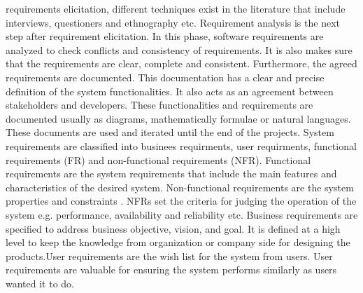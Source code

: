 requirements elicitation, different techniques exist in the literature that
include interviews, questioners and ethnography etc.
Requirement analysis \cite{Nuseibeh:2000} is the next step
after requirement elicitation. In this phase, software requirements are analyzed
to check conflicts and consistency of requirements. It is also makes sure that
the requirements are clear, complete and consistent. Furthermore, the agreed
requirements are documented. This documentation has a clear and precise
definition of the system functionalities. It also acts as an agreement between
stakeholders and developers. These functionalities and requirements are
documented usually as diagrams, mathematically formulae or natural languages.
These documents are used and iterated until the end of the projects.
System requirements are classified into businees requirments, user requirments,
functional requirements (FR) and non-functional requirements (NFR). Functional
requirements are the system requirements that include the main features and
characteristics of the desired system. Non-functional requirements are the
system properties and constraints \cite{Davis:1993, Glinz}. NFRs set the
criteria for judging the operation of the system e.g.
performance, availability and reliability etc. Business requirements are specified to address business objective, 
vision, and goal. It is defined at a high level to keep the knowledge from organization or company side for 
designing the products.User requirements are 
the wish list for the system from users. User requirements are valuable for ensuring the system performs similarly as users wanted it to do.
